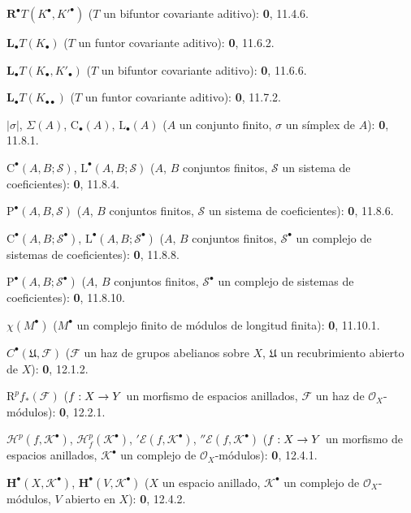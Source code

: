 \documentclass[10pt,oneside,openany]{book}
\theoremstyle{egaenv}\newtheorem*{env}{---}
\theoremstyle{egastatement}
\theoremstyle{egadescription}
\renewcommand{\to}{\mathchoice{\longrightarrow}{\rightarrow}{\rightarrow}{\rightarrow}}
\begin{document}
\begin{flushleft}
$\mathbf R^\bullet T(K^\bullet,K'^{\bullet})$ ($T$ un bifuntor covariante
aditivo): \textbf 0, 11.4.6.

$\mathbf L_\bullet T(K_\bullet)$ ($T$ un funtor covariante aditivo): \textbf 0, 11.6.2.

$\mathbf L_\bullet T(K_\bullet,K'_\bullet)$ ($T$ un bifuntor covariante
aditivo): \textbf 0, 11.6.6.

$\mathbf L_\bullet T(K_{\bullet\bullet})$ ($T$ un funtor covariante aditivo):
\textbf 0, 11.7.2.

$|\sigma|$, $\Sigma(A)$, $\mathrm C_\bullet(A)$, $\mathrm L_\bullet(A)$
($A$ un conjunto finito, $\sigma$ un símplex de $A$): \textbf 0, 11.8.1.

$\mathrm C^\bullet(A,B;\mathscr S)$, $\mathrm L^\bullet(A,B;\mathscr S)$
($A$, $B$ conjuntos finitos, $\mathscr S$ un sistema de coeficientes): \textbf 0, 11.8.4.

$\mathrm P^\bullet(A,B,\mathscr S)$ ($A$, $B$ conjuntos finitos, $\mathscr S$ un
sistema de coeficientes): \textbf 0, 11.8.6.

$\mathrm C^\bullet(A,B;\mathscr S^\bullet)$,
$\mathrm L^\bullet(A,B;\mathscr S^\bullet)$ ($A$, $B$ conjuntos finitos,
$\mathscr S^\bullet$ un complejo de sistemas de coeficientes): \textbf 0, 11.8.8.

$\mathrm P^\bullet(A,B;\mathscr S^\bullet)$ ($A$, $B$ conjuntos finitos,
$\mathscr S^\bullet$ un complejo de sistemas de coeficientes): \textbf 0, 11.8.10.

$\chi(M^\bullet)$ ($M^\bullet$ un complejo finito de módulos de longitud finita):
\textbf 0, 11.10.1.

$C^\bullet(\mathfrak U,\mathcal F)$ ($\mathcal F$ un haz de grupos abelianos
sobre $X$, $\mathfrak U$ un recubrimiento abierto de $X$): \textbf 0, 12.1.2.

$\mathrm R^pf_*(\mathcal F)$ ($f:X\to Y$ un morfismo de espacios anillados,
$\mathcal F$ un haz de $\mathcal O_X$-módulos): \textbf 0, 12.2.1.

$\mathscr H^p(f,\mathcal K^\bullet)$,
$\mathscr H_f^p(\mathcal K^\bullet)$, ${}'\mathcal E(f,\mathcal K^\bullet)$,
${}''\mathcal E(f,\mathcal K^\bullet)$ ($f:X\to Y$ un morfismo de espacios anillados,
$\mathcal K^\bullet$ un complejo de $\mathcal O_X$-módulos): \textbf 0, 12.4.1.

$\mathbf H^\bullet(X,\mathcal K^\bullet)$,
$\mathbf H^\bullet(V,\mathcal K^\bullet)$ ($X$ un espacio anillado,
$\mathcal K^\bullet$ un complejo de $\mathcal O_X$-módulos, $V$ abierto en $X$):
\textbf 0, 12.4.2.


\end{flushleft}
\end{document}
